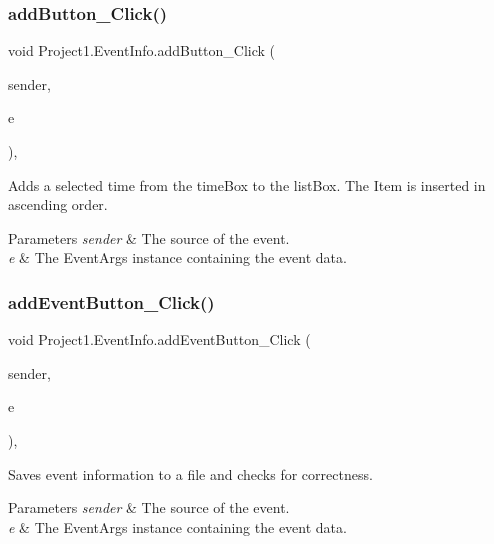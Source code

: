 \subsubsection{\texorpdfstring{add\+Button\+\_\+\+Click()}{addButton\_Click()}}
{\footnotesize\ttfamily void Project1.\+Event\+Info.\+add\+Button\+\_\+\+Click (\begin{DoxyParamCaption}\item[{object}]{sender,  }\item[{Event\+Args}]{e }\end{DoxyParamCaption})\hspace{0.3cm}{\ttfamily [inline]}, {\ttfamily [private]}}



Adds a selected time from the time\+Box to the list\+Box. The Item is inserted in ascending order. 


\begin{DoxyParams}{Parameters}
{\em sender} & The source of the event.\\
\hline
{\em e} & The Event\+Args instance containing the event data.\\
\hline
\end{DoxyParams}
\mbox{\label{classProject1_1_1EventInfo_a3b0662eb1959327307b4e4992123378f}} 
\subsubsection{\texorpdfstring{add\+Event\+Button\+\_\+\+Click()}{addEventButton\_Click()}}
{\footnotesize\ttfamily void Project1.\+Event\+Info.\+add\+Event\+Button\+\_\+\+Click (\begin{DoxyParamCaption}\item[{object}]{sender,  }\item[{Event\+Args}]{e }\end{DoxyParamCaption})\hspace{0.3cm}{\ttfamily [inline]}, {\ttfamily [private]}}



Saves event information to a file and checks for correctness. 


\begin{DoxyParams}{Parameters}
{\em sender} & The source of the event.\\
\hline
{\em e} & The Event\+Args instance containing the event data.\\
\hline
\end{DoxyParams}
\mbox{\label{classProject1_1_1EventInfo_a64e3ce2cb6745b461022d2a968cad153}} 
